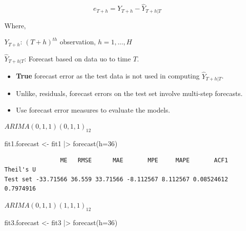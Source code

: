 \documentclass[
  11pt,
  a4paper,
]{report}
\newenvironment{Shaded}{\begin{snugshade}}{\end{snugshade}}
\newcommand{\AttributeTok}[1]{\textcolor[rgb]{0.40,0.45,0.13}{#1}}
\newcommand{\DecValTok}[1]{\textcolor[rgb]{0.68,0.00,0.00}{#1}}
\newcommand{\FunctionTok}[1]{\textcolor[rgb]{0.28,0.35,0.67}{#1}}
\newcommand{\NormalTok}[1]{\textcolor[rgb]{0.00,0.23,0.31}{#1}}
\newcommand{\OtherTok}[1]{\textcolor[rgb]{0.00,0.23,0.31}{#1}}
\newcommand{\SpecialCharTok}[1]{\textcolor[rgb]{0.37,0.37,0.37}{#1}}
\begin{document}
\[e_{T+h}=Y_{T+h}-\hat{Y}_{T+h|T}\]

Where,

\(Y_{T+h}\): \((T+h)^{th}\) observation, \(h=1,..., H\)

\(\hat{Y}_{T+h|T}\): Forecast based on data uo to time \(T\).

\begin{itemize}
\item
  \textbf{True} forecast error as the test data is not used in computing
  \(\hat{Y}_{T+h|T}\).
\item
  Unlike, residuals, forecast errors on the test set involve multi-step
  forecasts.
\item
  Use forecast error measures to evaluate the models.
\end{itemize}

\(ARIMA(0,1,1)(0,1,1)_{12}\)

\begin{Shaded}
\begin{Highlighting}[]
\NormalTok{fit1.forecast }\OtherTok{\textless{}{-}}\NormalTok{ fit1 }\SpecialCharTok{|\textgreater{}} 
  \FunctionTok{forecast}\NormalTok{(}\AttributeTok{h=}\DecValTok{36}\NormalTok{) }
\end{Highlighting}
\end{Shaded}

\begin{Shaded}
\end{Shaded}

\begin{verbatim}
                ME   RMSE      MAE       MPE     MAPE       ACF1 Theil's U
Test set -33.71566 36.559 33.71566 -8.112567 8.112567 0.08524612 0.7974916
\end{verbatim}

\(ARIMA(0,1,1)(1,1,1)_{12}\)

\begin{Shaded}
\begin{Highlighting}[]
\NormalTok{fit3.forecast }\OtherTok{\textless{}{-}}\NormalTok{ fit3 }\SpecialCharTok{|\textgreater{}}
  \FunctionTok{forecast}\NormalTok{(}\AttributeTok{h=}\DecValTok{36}\NormalTok{) }
\end{Highlighting}
\end{Shaded}

\begin{Shaded}
\end{Shaded}
\end{document}
